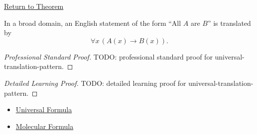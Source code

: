 \newpage
{}
\label{prf:universal-translation-pattern}

\begin{remark*}[Return]
\hyperref[prop:universal-translation-pattern]{Return to Theorem}
\end{remark*}

\begin{theorem*}
In a broad domain, an English statement of the form ``All \(A\) are \(B\)''
is translated by
\[
\forall x\,(A(x)\to B(x)).
\]
\end{theorem*}

\begin{proof}[Professional Standard Proof]
\LRAProofBodyStart
TODO: professional standard proof for universal-translation-pattern.
\end{proof}

\begin{proof}[Detailed Learning Proof]
\LRAProofBodyStart
TODO: detailed learning proof for universal-translation-pattern.
\end{proof}

\begin{remark*}
\end{remark*}

\begin{dependencies}
\begin{itemize}
  \item \hyperref[def:universal-q]{Universal Formula}
  \item \hyperref[def:molecular]{Molecular Formula}
\end{itemize}
\end{dependencies}

\clearpage
